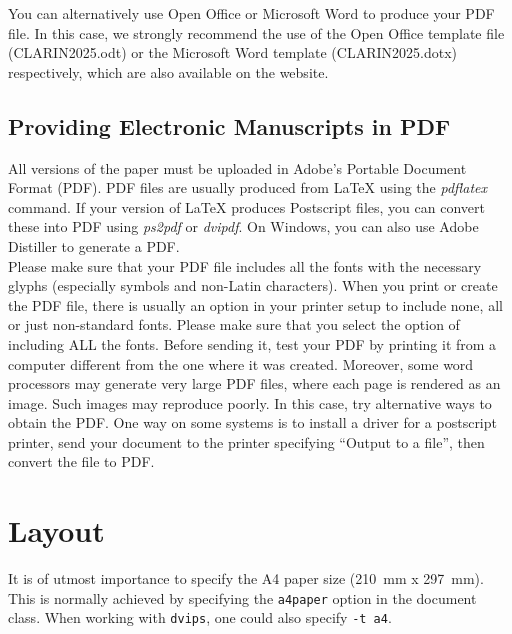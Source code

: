 \documentclass[a4paper,11pt]{article}
\begin{document}
You can alternatively use Open Office or Microsoft Word to produce your PDF file. 
In this case, we strongly recommend the use of the Open Office template file
(CLARIN2025.odt) or the Microsoft Word template
(CLARIN2025.dotx) respectively, which are also available on the website.


\subsection{Providing Electronic Manuscripts in PDF} \label{sect:pdf}

All versions of the paper must be uploaded in Adobe's
Portable Document Format (PDF). PDF files are usually produced from
LaTeX using the \textit{pdflatex} command. If your version of
LaTeX produces Postscript files, you can convert these into PDF
using \textit{ps2pdf} or \textit{dvipdf}. On Windows, you can also use
Adobe Distiller to generate a PDF.\\

Please make sure that your PDF file includes all the fonts
with the necessary glyphs
(especially symbols and non-Latin
characters). When you print or create the PDF file, there is usually
an option in your printer setup to include none, all or just
non-standard fonts.  Please make sure that you select the option of
including ALL the fonts. Before sending it, test your PDF by
  printing it from a computer different from the one where it was
  created. Moreover, some word processors may generate very large PDF
files, where each page is rendered as an image. Such images may
reproduce poorly. In this case, try alternative ways to obtain the
PDF. One way on some systems is to install a driver for a postscript
printer, send your document to the printer specifying ``Output to a
file'', then convert the file to PDF.

\section{Layout} \label{ssec:layout}

It is of utmost importance to specify the A4 paper size (210~mm
x 297~mm). This is normally achieved by
specifying the \texttt{a4paper} option  in the document class.
When working with {\tt dvips}, one could also specify {\tt -t a4}.\\
\end{document}
